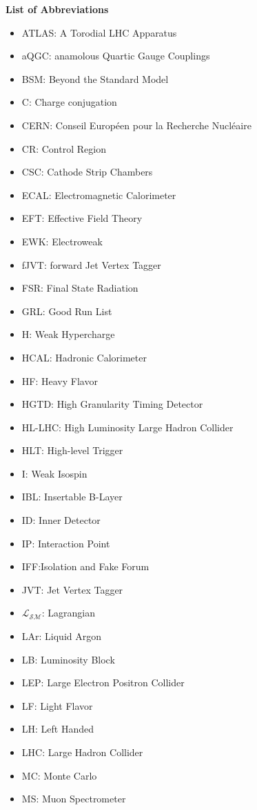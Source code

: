 \textbf{\Large{List of Abbreviations}}

\begin{itemize}
\item{ATLAS: A Torodial LHC Apparatus}
\item{aQGC: anamolous Quartic Gauge Couplings} 
\item{BSM: Beyond the Standard Model}
\item{C: Charge conjugation}
\item{CERN: Conseil Europ\'{e}en pour la Recherche Nucl\'{e}aire}
\item{CR: Control Region}
\item{CSC: Cathode Strip Chambers } 
\item{ECAL: Electromagnetic Calorimeter} 
\item{EFT: Effective Field Theory}
\item{EWK: Electroweak}
\item{fJVT: forward Jet Vertex Tagger} 
\item{FSR: Final State Radiation}
\item{GRL: Good Run List}
\item{H: Weak Hypercharge}
\item{HCAL: Hadronic Calorimeter}
\item{HF: Heavy Flavor}
\item{HGTD: High Granularity Timing Detector} 
\item{HL-LHC: High Luminosity Large Hadron Collider}  
\item{HLT: High-level Trigger} 
\item{I: Weak Isospin}
\item{IBL: Insertable B-Layer} 
\item{ID: Inner Detector} 
\item{IP: Interaction Point}
\item{IFF:Isolation and Fake Forum}
\item{JVT: Jet Vertex Tagger} 
\item{$\mathcal{L_{SM}}$: Lagrangian}
\item{LAr: Liquid Argon} 
\item{LB: Luminosity Block}
\item{LEP: Large Electron Positron Collider} 
\item{LF: Light Flavor} 
\item{LH:  Left Handed}
\item{LHC: Large Hadron Collider}
\item{MC: Monte Carlo}
\item{MS: Muon Spectrometer}

\end{itemize}
